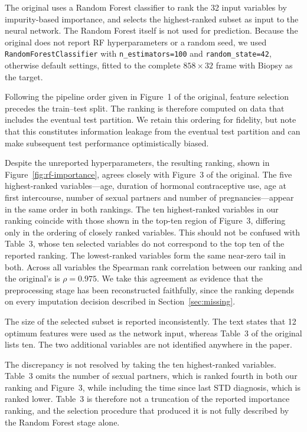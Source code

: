 The original uses a Random Forest classifier to rank the 32 input variables by
impurity-based importance, and selects the highest-ranked subset as input to
the neural network. The Random Forest itself is not used for prediction.
Because the original does not report RF hyperparameters or a random seed, we
used \texttt{RandomForestClassifier} with \texttt{n\_estimators=100} and
\texttt{random\_state=42}, otherwise default settings, fitted to the complete
$858 \times 32$ frame with Biopsy as the target.

Following the pipeline order given in Figure~1 of the original, feature
selection precedes the train--test split. The ranking is therefore computed on
data that includes the eventual test partition. We retain this ordering for
fidelity, but note that this constitutes information leakage from the eventual
test partition and can make subsequent test performance optimistically biased.

Despite the unreported hyperparameters, the resulting ranking, shown in
Figure~\ref{fig:rf-importance}, agrees closely with Figure~3 of the original.
The five highest-ranked variables---age, duration of hormonal contraceptive
use, age at first intercourse, number of sexual partners and number of
pregnancies---appear in the same order in both rankings. The ten highest-ranked
variables in our ranking coincide with those shown in the top-ten region of
Figure~3, differing only in the ordering of closely ranked variables. This
should not be confused with Table~3, whose ten selected variables do not
correspond to the top ten of the reported ranking. The lowest-ranked variables
form the same near-zero tail in both. Across all variables the Spearman rank
correlation between our ranking and the original's is $\rho = 0.975$. We take
this agreement as evidence that the preprocessing stage has been reconstructed
faithfully, since the ranking depends on every imputation decision described in
Section~\ref{sec:missing}.

The size of the selected subset is reported inconsistently. The text states
that 12 optimum features were used as the network input, whereas Table~3 of the
original lists ten. The two additional variables are not identified anywhere in
the paper.

The discrepancy is not resolved by taking the ten highest-ranked variables.
Table~3 omits the number of sexual partners, which is ranked fourth in both our
ranking and Figure~3, while including the time since last STD diagnosis, which
is ranked lower. Table~3 is therefore not a truncation of the reported
importance ranking, and the selection procedure that produced it is not fully
described by the Random Forest stage alone.

